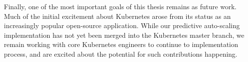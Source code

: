Finally, one of the most important goals of this thesis remains as future work.
Much of the initial excitement about Kubernetes arose from its status as an
increasingly popular open-source application. While our predictive auto-scaling
implementation has not yet been merged into the Kubernetes master branch, we
remain working with core Kubernetes engineers to continue to implementation
process, and are excited about the potential for such contributions happening.
